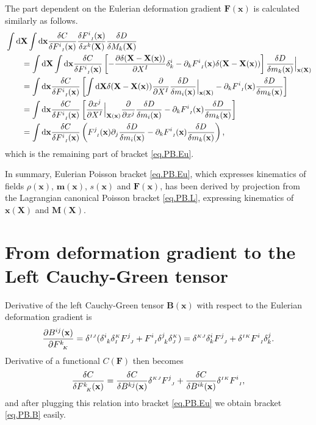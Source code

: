 \documentclass[
10pt, %
a4paper, %
oneside, %
headinclude,footinclude, %
BCOR5mm, %
]{scrartcl}
\newcommand{\xx}{\mathbf{x}}
\newcommand{\XX}{\mathbf{X}}
\newcommand{\dX}{\mathrm{d}\XX}
\newcommand{\dx}{\mathrm{d}\xx}
\newcommand{\mm}{\mathbf{m}}
\newcommand{\MM}{\mathbf{M}}
\newcommand{\FF}{\mathbf{F}}
\newcommand{\BB}{\mathbf{B}}
\newcommand{\sK}{{\mathsmaller K}}
\newcommand{\sI}{{\mathsmaller I}}
\newcommand{\sJ}{{\mathsmaller J}}
\newcommand{\F}[2]{F^{#1}_{\ \, \mathsmaller#2}}
\begin{document}
The part dependent on the Eulerian deformation gradient $\FF(\xx)$ is calculated similarly as follows.
\begin{align}
	&\int\dX \int\dx \frac{\delta C}{\delta \F{i}{I}(\xx)} \frac{\delta \F{i}{I}(\xx)}{\delta 
	x^k(\XX)} \frac{\delta D}{\delta M_k(\XX)}\nonumber\\
	&\qquad=\int\dX \int\dx \frac{\delta C}{\delta \F{i}{I}(\xx)}\left[
	- \frac{\partial \delta(\XX-\XX(\xx))}{\partial X^I}\delta^i_k
	-\partial_k \F{i}{I}(\xx)\delta(\XX-\XX(\xx))\right]\frac{\delta D}{\delta 
	m_k(\xx)}\Big|_{\xx(\XX)}\nonumber\\
&\qquad=\int\dx  \frac{\delta C}{\delta \F{i}{I}(\xx)}\left[
	\int\dX \delta(\XX-\XX(\xx)) \frac{\partial}{\partial X^I}\frac{\delta D}{\delta m_i(\xx)}\Big|_{\xx(\XX)}
	-\partial_k \F{i}{I}(\xx)\frac{\delta D}{\delta m_k(\xx)}\right]\nonumber\\
&\qquad=\int\dx  \frac{\delta C}{\delta \F{i}{I}(\xx)}\left[
	\frac{\partial x^j}{\partial X^I}\Big|_{\XX(\xx)}\frac{\partial}{\partial x^j}\frac{\delta D}{\delta m_i(\xx)}
	-\partial_k \F{i}{I}(\xx)\frac{\delta D}{\delta m_k(\xx)}\right]\nonumber\\
&\qquad=\int\dx  \frac{\delta C}{\delta \F{i}{I}(\xx)}\left(\F{j}{I}(\xx)\partial_j \frac{\delta 
D}{\delta m_i(\xx)}
	-\partial_k \F{i}{I}(\xx)\frac{\delta D}{\delta m_k(\xx)}\right),
\end{align}
which is the remaining part of bracket \eqref{eq.PB.Eu}. 

In summary, Eulerian Poisson bracket \eqref{eq.PB.Eu}, which expresses kinematics of fields $\rho(\xx)$, $\mm(\xx)$, $s(\xx)$ and $\FF(\xx)$, has been derived by projection from the Lagrangian canonical Poisson bracket \eqref{eq.PB.L}, expressing kinematics of $\xx(\XX)$ and $\MM(\XX)$.



\section{From deformation gradient to the Left Cauchy-Green tensor}\label{sec.F-B}
Derivative of the left Cauchy-Green tensor $\BB(\xx)$ with respect to the Eulerian deformation gradient is
\begin{equation}
	\frac{\partial B^{ij}(\xx)}{\partial \F{k}{K}} = \delta^{\sI\sJ}(\delta^i_{\ k} \delta^\sK_\sI 
	\F{j}{J} +  
	\F{i}{I} \delta^j_{\ k} \delta^\sK_\sJ)
	= \delta^{\sK\sJ}\delta^i_k \F{j}{J} +  \delta^{\sI\sK} \F{i}{I} \delta^j_k.
\end{equation}
Derivative of a functional $C(\FF)$ then becomes
\begin{equation}
	\frac{\delta C}{\delta \F{k}{K}(\xx)} = 
	\frac{\delta C}{\delta B^{kj}(\xx)}\delta^{\sK\sJ} \F{j}{J} +  \frac{\delta C}{\delta 
	B^{ik}(\xx)}\delta^{\sI\sK} \F{i}{I},
\end{equation}
and after plugging this relation into bracket \eqref{eq.PB.Eu} we obtain bracket \eqref{eq.PB.B} easily.
\end{document}
